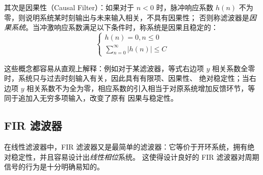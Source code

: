其次是因果性（Causal Filter）：如果对于 $n< 0$ 时，脉冲响应系数 $h(n)$ 不为零，则说明系统某时刻输出与未来输入相关，不具有因果性；
否则称滤波器是\emph{因果系统}。当冲激响应系数满足以下条件时，称系统是因果且稳定的：
\begin{equation}
    \begin{cases}
        h(n)=0, n\le 0 \\
        \sum_{n=0}^{\infty} \vert h(n) \vert \le C
    \end{cases}
\end{equation}

这些概念都容易从直观上解释：例如对于某滤波器，等式右边项 $y$ 相关系数全零时，系统只与过去时刻输入有关，因此具有有限项、因果性、
绝对稳定性；当右边项 $y$ 相关系数不为全为零，相应系数的引入相当于对原系统增加反馈环节，等同于追加入无穷多项输入，改变了原有
因果与稳定性。

\subsection{FIR 滤波器}

在线性滤波器中，FIR 滤波器又是最简单的滤波器：它等价于开环系统，拥有绝对稳定性，并且容易设计出\emph{线性相位}\cite{enwiki:1140890375}系统。
这使得设计良好的 FIR 滤波器对周期信号的行为是十分明确易知的。
